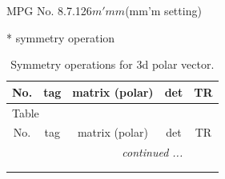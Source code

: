 \documentclass[fleqn,8pt]{jsarticle}
\begin{document}
\setcounter{MaxMatrixCols}{32}

\renewcommand{\tablename}{Table~}
\renewcommand{\figurename}{Figure~}
\begin{center}
\LARGE
MPG No. 8.7.126\quad$m'mm$\quad(mm'm setting)
\end{center}
* symmetry operation
\renewcommand{\arraystretch}{1.3}
\begin{longtable}{ccccc}
\caption{Symmetry operations for 3d polar vector.}
 \\
 \hline \hline
No. & tag & matrix (polar) & det & TR \\ \hline \endfirsthead

\multicolumn{4}{l}{\tablename\ \thetable{}} \\
 \hline \hline
No. & tag & matrix (polar) & det & TR \\ \hline \endhead

 \hline \hline
\multicolumn{4}{r}{\footnotesize\it continued ...} \\ \endfoot

 \hline \hline
\multicolumn{4}{r}{} \\ \endlastfoot


\end{longtable}
\end{document}
